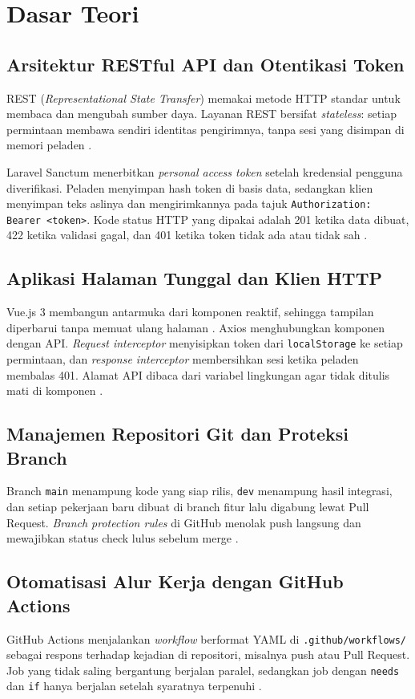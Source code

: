 \documentclass[a4paper,oneside,12pt]{report}
\begin{document}
\clearpage

\chapter{Dasar Teori}

\section{Arsitektur RESTful API dan Otentikasi Token}
REST (\textit{Representational State Transfer}) memakai metode HTTP standar untuk membaca dan mengubah sumber daya. Layanan REST bersifat \textit{stateless}: setiap permintaan membawa sendiri identitas pengirimnya, tanpa sesi yang disimpan di memori peladen \cite{laravel-sanctum}.

Laravel Sanctum menerbitkan \textit{personal access token} setelah kredensial pengguna diverifikasi. Peladen menyimpan hash token di basis data, sedangkan klien menyimpan teks aslinya dan mengirimkannya pada tajuk \texttt{Authorization: Bearer <token>}. Kode status HTTP yang dipakai adalah 201 ketika data dibuat, 422 ketika validasi gagal, dan 401 ketika token tidak ada atau tidak sah \cite{laravel-sanctum}.

\section{Aplikasi Halaman Tunggal dan Klien HTTP}
Vue.js 3 membangun antarmuka dari komponen reaktif, sehingga tampilan diperbarui tanpa memuat ulang halaman \cite{vuejs}. Axios menghubungkan komponen dengan API. \textit{Request interceptor} menyisipkan token dari \texttt{localStorage} ke setiap permintaan, dan \textit{response interceptor} membersihkan sesi ketika peladen membalas 401. Alamat API dibaca dari variabel lingkungan agar tidak ditulis mati di komponen \cite{axios}.

\section{Manajemen Repositori Git dan Proteksi Branch}
Branch \texttt{main} menampung kode yang siap rilis, \texttt{dev} menampung hasil integrasi, dan setiap pekerjaan baru dibuat di branch fitur lalu digabung lewat Pull Request. \textit{Branch protection rules} di GitHub menolak push langsung dan mewajibkan status check lulus sebelum merge \cite{github-protection}.

\section{Otomatisasi Alur Kerja dengan GitHub Actions}
GitHub Actions menjalankan \textit{workflow} berformat YAML di \texttt{.github/workflows/} sebagai respons terhadap kejadian di repositori, misalnya push atau Pull Request. Job yang tidak saling bergantung berjalan paralel, sedangkan job dengan \texttt{needs} dan \texttt{if} hanya berjalan setelah syaratnya terpenuhi \cite{github-actions}.
\end{document}
